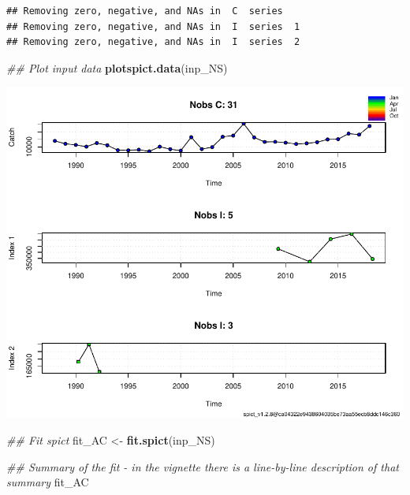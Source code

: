 \documentclass[
]{article}
\newenvironment{Shaded}{\begin{snugshade}}{\end{snugshade}}
\newcommand{\CommentTok}[1]{\textcolor[rgb]{0.56,0.35,0.01}{\textit{#1}}}
\newcommand{\KeywordTok}[1]{\textcolor[rgb]{0.13,0.29,0.53}{\textbf{#1}}}
\newcommand{\NormalTok}[1]{#1}
\newcommand{\StringTok}[1]{\textcolor[rgb]{0.31,0.60,0.02}{#1}}
\begin{document}
\begin{verbatim}
## Removing zero, negative, and NAs in  C  series    
## Removing zero, negative, and NAs in  I  series  1  
## Removing zero, negative, and NAs in  I  series  2
\end{verbatim}

\begin{Shaded}
\begin{Highlighting}[]
\CommentTok{## Plot input data}
\KeywordTok{plotspict.data}\NormalTok{(inp_NS)}
\end{Highlighting}
\end{Shaded}

\includegraphics{aru.27.123a4_SPiCT_WD_files/figure-latex/fit_scenario4-1.pdf}

\begin{Shaded}
\begin{Highlighting}[]
\CommentTok{## Fit spict}
\NormalTok{fit_AC <-}\StringTok{ }\KeywordTok{fit.spict}\NormalTok{(inp_NS)}

\CommentTok{## Summary of the fit - in the vignette there is a line-by-line description of that summary}
\NormalTok{fit_AC}
\end{Highlighting}
\end{Shaded}
\end{document}
